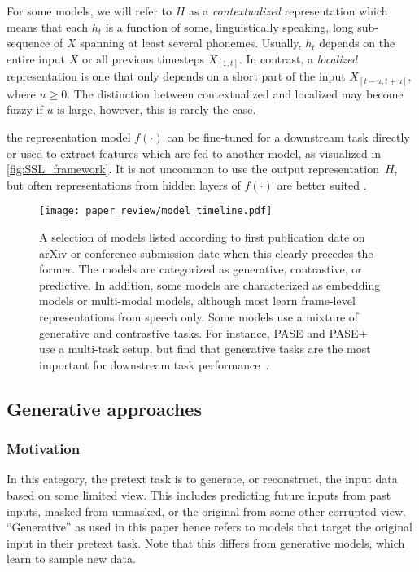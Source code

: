 For some models, we will refer to $H$ as a \emph{contextualized} representation which means that each $h_t$ is a function of some, linguistically speaking, long sub-sequence of $X$ spanning at least several phonemes. Usually, $h_t$ depends on the entire input $X$ or all previous timesteps $X_{[1,t]}$. In contrast, a \emph{localized} representation is one that only depends on a short part of the input $X_{[t - u,t + u]}$, where $u \geq 0$. The distinction between contextualized and localized may become fuzzy if $u$ is large, however, this is rarely the case.

 the representation model $f(\cdot)$ can be fine-tuned for a downstream task directly or used to extract features which are fed to another model, as visualized in \cref{fig:SSL_framework}. It is not uncommon to use the output representation~$H$, but often representations from hidden layers of $f(\cdot)$ are better suited \cite{pasad_layerwise_2021}.


\begin{figure*}[t!]
    \centering
    \texttt{[image: paper\_review/model\_timeline.pdf]}
	 \caption[Selection of self-supervised models for speech.]{A selection of models listed according to first publication date
	 on arXiv or conference submission date when this clearly precedes the
	 former. The models are categorized as generative, contrastive, or predictive.
	 In addition, some models are characterized as embedding models or
	 multi-modal models, although most learn frame-level
	 representations from speech only. Some models use a mixture of generative
	 and contrastive tasks. For instance, PASE and PASE+ use a multi-task setup,
	 but find that generative tasks are the most important for downstream
	 task performance~\cite{pascual_learning_2019}.}
    \label{fig:timeline}
\end{figure*}


 

\subsection{Generative approaches}
\label{sec:generative}

\subsubsection{Motivation}

In this category, the pretext task is to generate, or reconstruct, the input data based on some limited view. This includes predicting future inputs from past inputs, masked from unmasked, or the original from some other corrupted view.  ``Generative'' as used in this paper hence refers to models that target the original input in their pretext task. Note that this differs from generative models, which learn  to sample new data.

